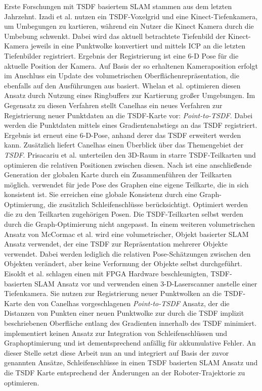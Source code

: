 Erste Forschungen mit TSDF basiertem SLAM stammen aus dem letzten Jahrzehnt.
Izadi et al. \cite{izadi2011kinectfusion} nutzen ein TSDF-Voxelgrid und eine Kinect-Tiefenkamera, um Umbegungen zu kartieren, während ein Nutzer die Kinect Kamera durch die Umbebung schwenkt. Dabei wird das aktuell betrachtete Tiefenbild der Kinect-Kamera jeweils in eine Punktwolke konvertiert und mittels ICP an die letzten Tiefenbilder registriert. Ergebnis der Registrierung ist eine 6-D Pose für die aktuelle Position der Kamera. Auf Basis der so erhaltenen Kameraposition erfolgt im Anschluss ein Update des volumetrischen Oberflächenrepräsentation, die ebenfalls auf den Ausführungen aus \cite{curless1996volumetric} basiert. Whelan et al. \cite{whelan2012kintinuous} optimieren diesen Ansatz durch Nutzung eines Ringbuffers zur Kartierung großer Umgebungen. Im Gegensatz zu diesen Verfahren stellt Canelhas \cite{Canelhas2017TruncatedSD} ein neues Verfahren zur Registrierung neuer Punktdaten an die TSDF-Karte vor: \emph{Point-to-TSDF}. Dabei werden die Punktdaten mittels eines Gradientenabstiegs an das TSDF registriert. Ergebnis ist erneut eine 6-D-Pose, anhand derer das TSDF erweitert werden kann. Zusätzlich liefert Canelhas \cite{Canelhas2017TruncatedSD} einen Überblick über das Themengebiet der \emph{TSDF}. Prisacariu et al. \cite{prisacariu2017infinitam} unterteilen den 3D-Raum in starre TSDF-Teilkarten und optimieren die relativen Positionen zwischen diesen. Nach \cite{prisacariu2017infinitam} ist eine anschließende Generation der globalen Karte durch ein Zusammenführen der Teilkarten möglich. \cite{prisacariu2017infinitam} verwendet für jede Pose des Graphen eine eigene Teilkarte, die in sich konsistent ist. Sie erreichen eine globale Konsistenz durch eine Graph-Optimierung, die zusätzlich Schleifenschlüsse berücksichtigt. Optimiert werden die zu den Teilkarten zugehörigen Posen. Die TSDF-Teilkarten selbst werden durch die Graph-Optimierung nicht angepasst. In einem weiteren volumetrischen Ansatz von McCormac et al. \cite{mccormac2018fusion++} wird eine volumetrischer, Objekt basierter SLAM Ansatz verwendet, der eine TSDF zur Repräsentation mehrerer Objekte verwendet. Dabei werden lediglich die relativen Pose-Schätzungen zwischen den Objekten verändert, aber keine Verformung der Objekte selbst durchgeführt. Eisoldt et al. \cite{HATSDF} schlagen einen mit FPGA Hardware beschleunigten, TSDF-basierten SLAM Ansatz vor und verwenden einen 3-D-Laserscanner anstelle einer Tiefenkamera. Sie nutzen zur Registrierung neuer Punktwolken an die TSDF-Karte den von Canelhas \cite{Canelhas2017TruncatedSD} vorgeschlagenen \emph{Point-to-TSDF} Ansatz, der die Distanzen von Punkten einer neuen Punktwolke zur durch die TSDF implizit beschriebenen Oberfläche entlang des Gradienten innerhalb des TSDF minimiert. \cite{HATSDF} implementiert keinen Ansatz zur Integration von Schleifenschlüssen und Graphoptimierung und ist dementsprechend anfällig für akkumulative Fehler. An dieser Stelle setzt diese Arbeit nun an und integriert auf Basis der zuvor genannten Ansätze, Schleifenschlüsse in einen TSDF basierten SLAM Ansatz und die TSDF Karte entsprechend der Änderungen an der Roboter-Trajektorie zu optimieren.





